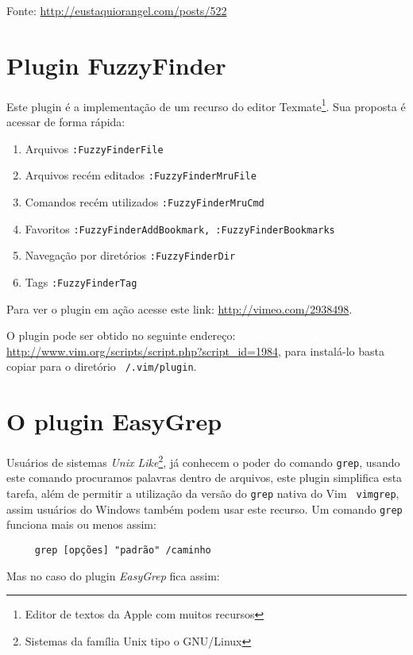 Fonte: \url{http://eustaquiorangel.com/posts/522}

\section{Plugin FuzzyFinder}
\label{sec:Plugin FuzzyFinder}
                                                                       
Este plugin é a implementação de um recurso do editor 
Texmate\footnote{Editor de textos da Apple com muitos recursos}.
Sua proposta é acessar de forma rápida:


\begin{enumerate}
\item Arquivos \verb|:FuzzyFinderFile|
\item Arquivos recém editados \verb|:FuzzyFinderMruFile|
\item Comandos recém utilizados \verb|:FuzzyFinderMruCmd|
\item Favoritos \verb|:FuzzyFinderAddBookmark, :FuzzyFinderBookmarks|
\item Navegação por diretórios \verb|:FuzzyFinderDir|
\item Tags {\tt :FuzzyFinderTag}
\end{enumerate}

Para ver o plugin em ação acesse este link: 
\url{http://vimeo.com/2938498}.


O plugin pode ser obtido no seguinte endereço: 
\url{http://www.vim.org/scripts/script.php?script_id=1984},
para instalá-lo basta copiar para o diretório 
{\tt ~/.vim/plugin}.

\section{O plugin EasyGrep}
\label{sec:O plugin EasyGrep}

Usuários de sistemas {\em Unix Like}\footnote{Sistemas da família Unix tipo o
GNU/Linux}, já conhecem o poder do comando {\tt grep}, usando este comando
procuramos palavras dentro de arquivos, este plugin simplifica esta tarefa,
além de permitir a utilização da versão do {\tt grep} nativa do Vim {\tt
vimgrep}, assim usuários do Windows também podem usar este recurso. Um comando
{\tt grep} funciona mais ou menos assim:

\begin{verbatim}
     grep [opções] "padrão" /caminho
\end{verbatim}

Mas no caso do plugin {\em EasyGrep} fica assim:

